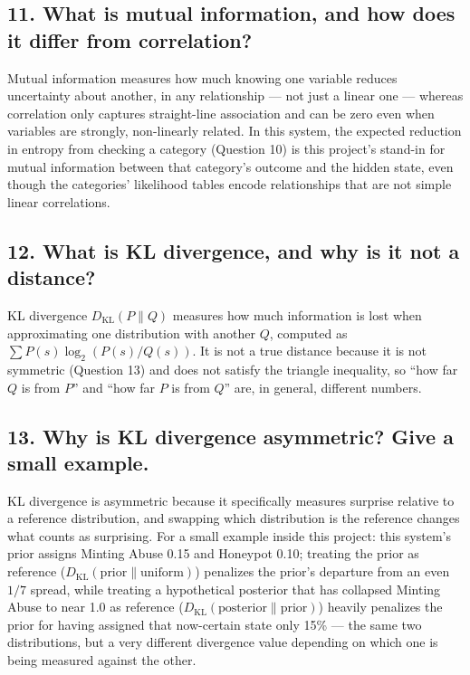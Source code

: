 \documentclass[11pt]{article}
\begin{document}
\subsection*{11. What is mutual information, and how does it differ from correlation?}

Mutual information measures how much knowing one variable reduces uncertainty about another, in any relationship --- not just a linear one --- whereas correlation only captures straight-line association and can be zero even when variables are strongly, non-linearly related. In this system, the expected reduction in entropy from checking a category (Question 10) is this project's stand-in for mutual information between that category's outcome and the hidden state, even though the categories' likelihood tables encode relationships that are not simple linear correlations.

\subsection*{12. What is KL divergence, and why is it not a distance?}

KL divergence $D_{\mathrm{KL}}(P\parallel Q)$ measures how much information is lost when approximating one distribution with another $Q$, computed as $\sum P(s)\log_2(P(s)/Q(s))$. It is not a true distance because it is not symmetric (Question 13) and does not satisfy the triangle inequality, so ``how far $Q$ is from $P$'' and ``how far $P$ is from $Q$'' are, in general, different numbers.

\subsection*{13. Why is KL divergence asymmetric? Give a small example.}

KL divergence is asymmetric because it specifically measures surprise relative to a reference distribution, and swapping which distribution is the reference changes what counts as surprising. For a small example inside this project: this system's prior assigns Minting Abuse 0.15 and Honeypot 0.10; treating the prior as reference ($D_{\mathrm{KL}}(\text{prior}\parallel\text{uniform})$) penalizes the prior's departure from an even $1/7$ spread, while treating a hypothetical posterior that has collapsed Minting Abuse to near 1.0 as reference ($D_{\mathrm{KL}}(\text{posterior}\parallel\text{prior})$) heavily penalizes the prior for having assigned that now-certain state only 15\% --- the same two distributions, but a very different divergence value depending on which one is being measured against the other.
\end{document}
